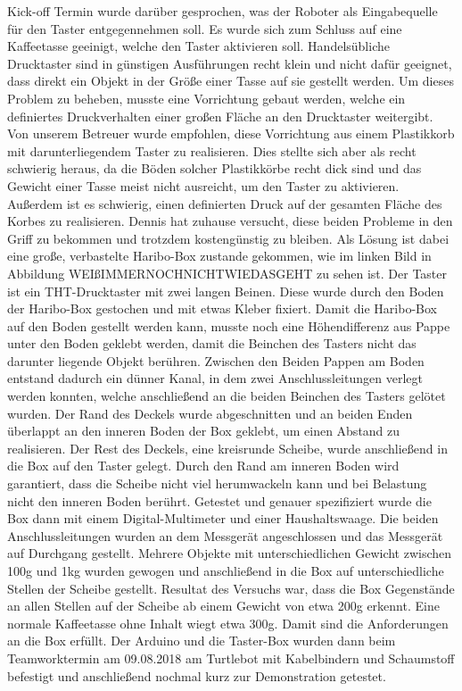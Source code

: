 \documentclass[a4paper,12pt,headsepline]{scrartcl}
\begin{document}
Kick-off Termin wurde darüber gesprochen, was der Roboter als Eingabequelle für den Taster entgegennehmen soll. Es wurde sich zum Schluss auf eine Kaffeetasse geeinigt, welche den Taster aktivieren soll. Handelsübliche Drucktaster sind in günstigen Ausführungen recht klein und nicht dafür geeignet, dass direkt ein Objekt in der Größe einer Tasse auf sie gestellt werden. Um dieses Problem zu beheben, musste eine Vorrichtung gebaut werden, welche ein definiertes Druckverhalten einer großen Fläche an den Drucktaster weitergibt. Von unserem Betreuer wurde empfohlen, diese Vorrichtung aus einem Plastikkorb mit darunterliegendem Taster zu realisieren. Dies stellte sich aber als recht schwierig heraus, da die Böden solcher Plastikkörbe recht dick sind und das Gewicht einer Tasse meist nicht ausreicht, um den Taster zu aktivieren. Außerdem ist es schwierig, einen definierten Druck auf der gesamten Fläche des Korbes zu realisieren. Dennis hat zuhause versucht, diese beiden Probleme in den Griff zu bekommen und trotzdem kostengünstig zu bleiben. Als Lösung ist dabei eine große, verbastelte Haribo-Box zustande gekommen, wie im linken Bild in Abbildung {WEIßIMMERNOCHNICHTWIEDASGEHT} zu sehen ist. Der Taster ist ein THT-Drucktaster mit zwei langen Beinen. Diese wurde durch den Boden der Haribo-Box gestochen und mit etwas Kleber fixiert. Damit die Haribo-Box auf den Boden gestellt werden kann, musste noch eine Höhendifferenz aus Pappe unter den Boden geklebt werden, damit die Beinchen des Tasters nicht das darunter liegende Objekt berühren. Zwischen den Beiden Pappen am Boden entstand dadurch ein dünner Kanal, in dem zwei Anschlussleitungen verlegt werden konnten, welche anschließend an die beiden Beinchen des Tasters gelötet wurden. Der Rand des Deckels wurde abgeschnitten und an beiden Enden überlappt an den inneren Boden der Box geklebt, um einen Abstand zu realisieren. Der Rest des Deckels, eine kreisrunde Scheibe, wurde anschließend in die Box auf den Taster gelegt. Durch den Rand am inneren Boden wird garantiert, dass die Scheibe nicht viel herumwackeln kann und bei Belastung nicht den inneren Boden berührt. Getestet und genauer spezifiziert wurde die Box dann mit einem Digital-Multimeter und einer Haushaltswaage. Die beiden Anschlussleitungen wurden an dem Messgerät angeschlossen und das Messgerät auf Durchgang gestellt. Mehrere Objekte mit unterschiedlichen Gewicht zwischen 100g und 1kg wurden gewogen und anschließend in die Box auf unterschiedliche Stellen der Scheibe gestellt. Resultat des Versuchs war, dass die Box Gegenstände an allen Stellen auf der Scheibe ab einem Gewicht von etwa 200g erkennt. Eine normale Kaffeetasse ohne Inhalt wiegt etwa 300g. Damit sind die Anforderungen an die Box erfüllt. Der Arduino und die Taster-Box wurden dann beim Teamworktermin am 09.08.2018 am Turtlebot mit Kabelbindern und Schaumstoff befestigt und anschließend nochmal kurz zur Demonstration getestet.
\end{document}
